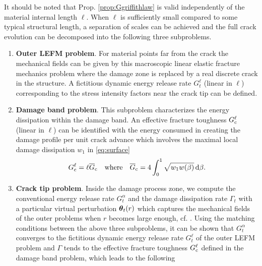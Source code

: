 It should be noted that Prop. \ref{prop:Ggriffithlaw} is valid independently of the material internal length $\ell$. When $\ell$ is sufficiently small compared to some typical structural length, a separation of scales can be achieved and the full crack evolution can be decomposed into the following three subproblems.
\begin{enumerate}
\item \textbf{Outer LEFM problem}. For material points far from the crack the mechanical fields can be given by this macroscopic linear elastic fracture mechanics problem where the damage zone is replaced by a real discrete crack in the structure. A fictitious dynamic energy release rate $G^\ell_t$ (linear in $\ell$) corresponding to the stress intensity factors near the crack tip can be defined.

\item \textbf{Damage band problem}. This subproblem characterizes the energy dissipation within the damage band. An effective fracture toughness $G_\mathrm{c}^\ell$ (linear in $\ell$) can be identified with the energy consumed in creating the damage profile per unit crack advance which involves the maximal local damage dissipation $w_1$ in \eqref{eq:surface}
\begin{equation} \label{eq:gcindamage}
G_\mathrm{c}^\ell=\ell\overline{G}_{\mathrm{c}}\quad\text{where}\quad\overline{G}_{\mathrm{c}}=4\int_0^1\sqrt{w_1w(\beta)}\,\mathrm{d}\beta.
\end{equation}

\item \textbf{Crack tip problem}. Inside the damage process zone, we compute the conventional energy release rate $G^\alpha_t$ and the damage dissipation rate $\Gamma_t$ with a particular virtual perturbation $\vtheta_t(r)$ which captures the mechanical fields of the outer problems when $r$ becomes large enough, cf. \cite{LiMarigo:2015}. Using the matching conditions between the above three subproblems, it can be shown that $G^\alpha_t$ converges to the fictitious dynamic energy release rate $G^\ell_t$ of the outer LEFM problem and $\Gamma$ tends to the effective fracture toughness $G_\mathrm{c}^\ell$ defined in the damage band problem, which leads to the following
\end{enumerate}

